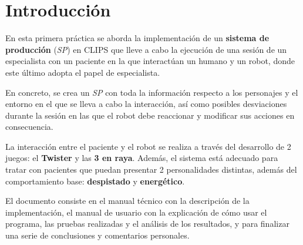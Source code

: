 \documentclass{uc3mpracticas}
\begin{document}
  \frontmatter



  \vspace{55mm}


  \newpage

  \tableofcontents

  \newpage

  \mainmatter

  \section{Introducción}

En esta primera práctica se aborda la implementación de un \textbf{sistema de producción} (\textit{SP}) en CLIPS que lleve a cabo la ejecución de una sesión de un especialista con un paciente en la que interactúan un humano y un robot, donde este último adopta el papel de especialista.

\vspace{2mm}

En concreto, se crea un \textit{SP} con toda la información respecto a los personajes y el entorno en el que se lleva a cabo la interacción, así como posibles desviaciones durante la sesión en las que el robot debe reaccionar y modificar sus acciones en consecuencia.

\vspace{2mm}

La interacción entre el paciente y el robot se realiza a través del desarrollo de 2 juegos: el \textbf{Twister} y las \textbf{3 en raya}. Además, el sistema está adecuado para tratar con pacientes que puedan presentar 2 personalidades distintas, además del comportamiento base: \textbf{despistado} y \textbf{energético}.

\vspace{2mm}

El documento consiste en el manual técnico con la descripción de la implementación, el manual de usuario con la explicación de cómo usar el programa, las pruebas realizadas y el análisis de los resultados, y para finalizar una serie de conclusiones y comentarios personales.
\end{document}
